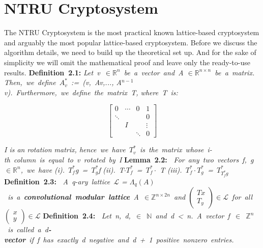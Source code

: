 
\section{NTRU Cryptosystem}
\label{chapter2}
\textit{}

The NTRU Cryptosystem is the most practical known lattice-based cryptosystem and arguably the most popular lattice-based cryptosystem. Before we discuss the algorithm details, we need to build up the theoretical set up. And for the sake of simplicity we will omit the mathematical proof and leave only the ready-to-use results. 
\newline
\newline
\textbf{Definition\ 2.1: }  \emph{Let\ v\ $\in \mathbb{R}^n$\ be\ a\ vector\ and\ A $\in \mathbb{R}^{n\times n}$\ be\ a\ matrix. Then,\ we\ define\ $A^*_v$\ :=\ (v,\ Av,..., A$^{n-1}$v).\ Furthermore,\ we\ define\ the\ matrix\ T, where\ T\ is: }
\begin{center}
        $$\left[\begin{array}{ccc|c}
                0 & \cdots & 0 & 1 \\ \hline
                \ddots & \ & \ & 0 \\
                \ & I & \ & \vdots \\
                \ & \ & \ddots & 0
\end{array}\right] $$
\end{center}
\emph{I is an rotation matrix, hence\ we\ have\ $T^*_v$\ is\ the\ matrix\ whose\ i-th\ column\ is\ equal\ to\ v\ rotated\ by\ I}
\newline
\newline
\textbf{Lemma\ 2.2:\ } \emph{For\ any\ two\ vectors\ f,\ g\ $\in \mathbb{R}^n$,\ we\ have}
\newline
\emph{(i).\ $T^*_f$g\ =\ $T^*_g$f}
\newline
\emph{(ii).\ T$\cdot T^*_f$\ =\ $T^*_f \cdot$ T}
\newline
\emph{(iii).\ $T^*_f\cdot T^*_g$\ =\ $T^*_{T^*_fg}$}
\newline
\newline
\textbf{Definition\ 2.3:\ } \emph{A\ q-ary\ lattice\ $\mathcal{L}$ = $\Lambda_{q}(A)$\ is\ a\ \textbf{convolutional\ modular\ lattice}\ A\ $\in \mathbb{Z}^{n \times 2 n}$\ and $\left(\begin{array}{l}{T x} \\ {T_{y}}\end{array}\right) \in \mathcal{L}$\ for\ all\ $\left(\begin{array}{l}{x} \\ {y}\end{array}\right) \in \mathcal{L}$}
\newline
\newline
\textbf{Definition\ 2.4:\ } \emph{Let\ n,\ d,\ $\in$\ $\mathbb{N}$\ and\ d\ <\ n.\ A\ vector\ f\ $\in$\ $\mathbb{Z}^n$\ is\ called\ a\ d\textbf{-vector}\ if\ f\ has\ exactly\ d\ negative\ and\ d\ +\ 1\ positive\ nonzero\ entries.}
\newline
\newline


